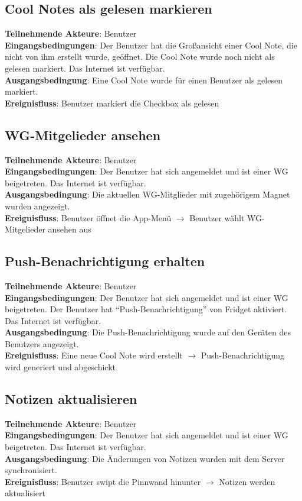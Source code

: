 \begin{flushleft}
		\subsection{Cool Notes als gelesen markieren}
		\textbf{Teilnehmende Akteure}: Benutzer \\
		\textbf{Eingangsbedingungen}: Der Benutzer hat die Großansicht einer Cool Note, die nicht von ihm erstellt wurde, geöffnet. Die Cool Note wurde noch nicht als gelesen markiert. Das Internet ist verfügbar. \\
		\textbf{Ausgangsbedingung}: Eine Cool Note wurde für einen Benutzer als gelesen markiert. \\
		\textbf{Ereignisfluss}: Benutzer markiert die Checkbox als gelesen
		
		\subsection{WG-Mitgelieder ansehen}
		\textbf{Teilnehmende Akteure}: Benutzer \\
		\textbf{Eingangsbedingungen}: Der Benutzer hat sich angemeldet und ist einer WG beigetreten. Das Internet ist verfügbar. \\
		\textbf{Ausgangsbedingung}: Die aktuellen WG-Mitglieder mit zugehörigem Magnet wurden angezeigt. \\
     	\textbf{Ereignisfluss}: Benutzer öffnet die App-Menü $\rightarrow$ Benutzer wählt WG-Mitgelieder ansehen aus
		
		\subsection{Push-Benachrichtigung erhalten}
		\textbf{Teilnehmende Akteure}: Benutzer \\
		\textbf{Eingangsbedingungen}: Der Benutzer hat sich angemeldet und ist einer WG beigetreten. Der Benutzer hat ``Push-Benachrichtigung'' von Fridget aktiviert. Das Internet ist verfügbar. \\
		\textbf{Ausgangsbedingung}: Die Push-Benachrichtigung wurde auf den Geräten des Benutzers angezeigt. \\
		\textbf{Ereignisfluss}: Eine neue Cool Note wird erstellt $\rightarrow$ Push-Benachrichtigung wird generiert und abgeschickt
		
		\subsection{Notizen aktualisieren}
		\textbf{Teilnehmende Akteure}: Benutzer \\
		\textbf{Eingangsbedingungen}: Der Benutzer hat sich angemeldet und ist einer WG beigetreten. Das Internet ist verfügbar. \\
		\textbf{Ausgangsbedingung}: Die Änderungen von Notizen wurden mit dem Server synchronisiert. \\
		\textbf{Ereignisfluss}: Benutzer swipt die Pinnwand hinunter $\rightarrow$ Notizen werden aktualisiert
		

\end{flushleft}
